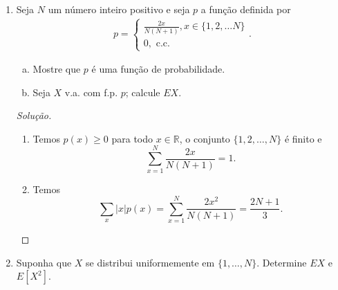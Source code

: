 \documentclass[../Notas.tex]{subfiles}
\begin{document}
\begin{enumerate}
    \begin{enumerate}[a)]
        \item Calcule $\displaystyle{ \sum_{x\in\mathbb{Z}} |x|p_X(x) }$.
        \item Mostre que $EX$ não existe.
    \end{enumerate}
    \begin{proof}[Solução]
        \begin{enumerate}[a)]
            \item Temos
            \[
            \sum_{x\in\mathbb{Z}}|x|p_X(x) = \frac{1}{2}\sum_{x\in\mathbb{Z}} \frac{1}{|x|+1} = \infty.
            \]
            \item Como a série acima diverge, não existe $EX$.
        \end{enumerate}   
    \end{proof}
    \item Seja $N$ um número inteiro positivo e seja $p$ a função definida por
    \begin{align*}
        p = \begin{cases}
            \frac{2x}{N(N+1)}, x\in\{1, 2, \dots N\} \\
            0, \text{ c.c.}
        \end{cases}.
    \end{align*}
    \begin{enumerate}[a)]
        \item Mostre que $p$ é uma função de probabilidade.
        \item Seja $X$ v.a. com f.p. $p$; calcule $EX$.
    \end{enumerate}
    \begin{proof}[Solução]
        \begin{enumerate}
            \item Temos $p(x)\geq 0$ para todo $x\in \mathbb{R}$, o conjunto $\{1, 2, \dots, N\}$
            é finito e
            \[
            \sum_{x=1}^N \frac{2x}{N(N+1)} = 1.
            \]
            \item Temos
            \[
            \sum_x |x|p(x) = \sum_{x=1}^N \frac{2x^2}{N(N+1)} = \frac{2N+1}{3}.
            \]
        \end{enumerate}
    \end{proof}
    \item Suponha que $X$ se distribui uniformemente em $\{1, \dots , N\}$. Determine $EX$ e $E[X^2]$.

\end{enumerate}
\end{document}
